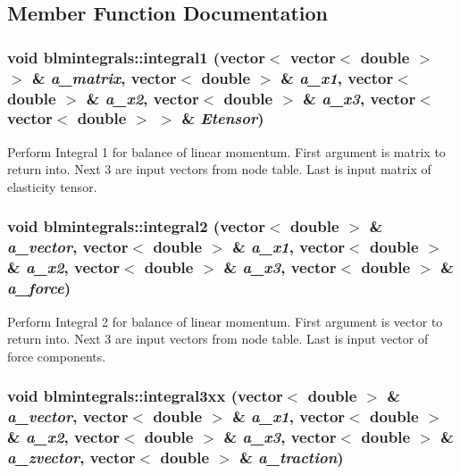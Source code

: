 \subsection{Member Function Documentation}
\hypertarget{classblmintegrals_a6bce8d9042569ae61748953a275309b5}{
\subsubsection[{integral1}]{\setlength{\rightskip}{0pt plus 5cm}void blmintegrals::integral1 (vector$<$ vector$<$ double $>$ $>$ \& {\em a\_\-matrix}, \/  vector$<$ double $>$ \& {\em a\_\-x1}, \/  vector$<$ double $>$ \& {\em a\_\-x2}, \/  vector$<$ double $>$ \& {\em a\_\-x3}, \/  vector$<$ vector$<$ double $>$ $>$ \& {\em Etensor})}}
\label{classblmintegrals_a6bce8d9042569ae61748953a275309b5}
Perform Integral 1 for balance of linear momentum. First argument is matrix to return into. Next 3 are input vectors from node table. Last is input matrix of elasticity tensor. \hypertarget{classblmintegrals_aa27da27cf77c5d936633c66d1813ad8d}{
\subsubsection[{integral2}]{\setlength{\rightskip}{0pt plus 5cm}void blmintegrals::integral2 (vector$<$ double $>$ \& {\em a\_\-vector}, \/  vector$<$ double $>$ \& {\em a\_\-x1}, \/  vector$<$ double $>$ \& {\em a\_\-x2}, \/  vector$<$ double $>$ \& {\em a\_\-x3}, \/  vector$<$ double $>$ \& {\em a\_\-force})}}
\label{classblmintegrals_aa27da27cf77c5d936633c66d1813ad8d}
Perform Integral 2 for balance of linear momentum. First argument is vector to return into. Next 3 are input vectors from node table. Last is input vector of force components. \hypertarget{classblmintegrals_a776e27864b68961f17e93d4465df9e75}{
\subsubsection[{integral3xx}]{\setlength{\rightskip}{0pt plus 5cm}void blmintegrals::integral3xx (vector$<$ double $>$ \& {\em a\_\-vector}, \/  vector$<$ double $>$ \& {\em a\_\-x1}, \/  vector$<$ double $>$ \& {\em a\_\-x2}, \/  vector$<$ double $>$ \& {\em a\_\-x3}, \/  vector$<$ double $>$ \& {\em a\_\-zvector}, \/  vector$<$ double $>$ \& {\em a\_\-traction})}}
